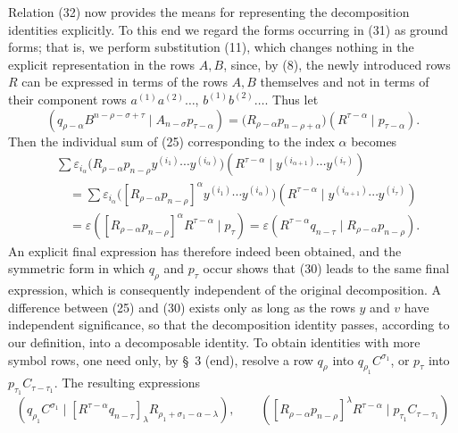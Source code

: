 \documentclass[10pt]{article}
\newcommand{\pair}[2]{(#1\mid #2)}
\newcommand{\eps}{\varepsilon}
\begin{document}
Relation (32) now provides the means for representing the decomposition
identities explicitly. To this end we regard the forms occurring in (31) as
ground forms; that is, we perform substitution (11), which changes nothing in
the explicit representation in the rows $A,B$, since, by (8), the newly
introduced rows $R$ can be expressed in terms of the rows $A,B$ themselves
and not in terms of their component rows $a^{(1)}a^{(2)}\ldots$,
$b^{(1)}b^{(2)}\ldots$. Thus let
\begin{equation}
 \pair{q_{\rho-\alpha}B^{n-\rho-\sigma+\tau}}{A_{n-\sigma}p_{\tau-\alpha}}
 =\bigl(R_{\rho-\alpha}p_{n-\rho+\alpha}\bigr)
  \pair{R^{\tau-\alpha}}{p_{\tau-\alpha}}.
\tag{33}
\end{equation}
Then the individual sum of (25) corresponding to the index $\alpha$ becomes
\begin{equation}
\begin{aligned}
&\sum \eps_{i_\alpha}
 \bigl(R_{\rho-\alpha}p_{n-\rho}y^{(i_1)}\cdots y^{(i_\alpha)}\bigr)
 \pair{R^{\tau-\alpha}}{y^{(i_{\alpha+1})}\cdots y^{(i_\tau)}}\\
&\quad=\sum \eps_{i_\alpha}
 \bigl([R_{\rho-\alpha}p_{n-\rho}]^\alpha
 y^{(i_1)}\cdots y^{(i_\alpha)}\bigr)
 \pair{R^{\tau-\alpha}}{y^{(i_{\alpha+1})}\cdots y^{(i_\tau)}}\\
&\quad=\eps\pair{[R_{\rho-\alpha}p_{n-\rho}]^\alpha
 R^{\tau-\alpha}}{p_\tau}
 =\eps\pair{R^{\tau-\alpha}q_{n-\tau}}
 {R_{\rho-\alpha}p_{n-\rho}}.
\end{aligned}
\tag{34}
\end{equation}
An explicit final expression has therefore indeed been obtained, and the
symmetric form in which $q_\rho$ and $p_\tau$ occur shows that (30) leads to
the same final expression, which is consequently independent of the original
decomposition. A difference between (25) and (30) exists only as long as the
rows $y$ and $v$ have independent significance, so that the decomposition
identity passes, according to our definition, into a decomposable identity.
To obtain identities with more symbol rows, one need only, by \S\ 3 (end),
resolve a row $q_\rho$ into $q_{\rho_1}C^{\sigma_1}$, or $p_\tau$ into
$p_{\tau_1}C_{\tau-\tau_1}$. The resulting expressions
\begin{equation}
 \pair{q_{\rho_1}C^{\sigma_1}}
 {[R^{\tau-\alpha}q_{n-\tau}]_\lambda
  R_{\rho_1+\sigma_1-\alpha-\lambda}},
 \qquad
 \pair{[R_{\rho-\alpha}p_{n-\rho}]^\lambda R^{\tau-\alpha}}
 {p_{\tau_1}C_{\tau-\tau_1}}
\tag{35}
\end{equation}
\end{document}
